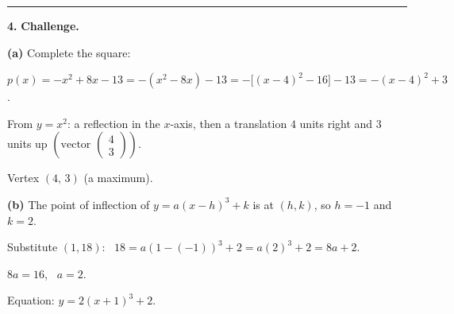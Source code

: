 \documentclass[12pt, twoside]{article}
\begin{document}
\bigskip\hrule\bigskip

\noindent\textbf{4.} \textbf{Challenge.}

\medskip

\textbf{(a)} Complete the square:

$p(x)=-x^2+8x-13=-(x^2-8x)-13=-\big[(x-4)^2-16\big]-13=-(x-4)^2+3$.

From $y=x^2$: a reflection in the $x$-axis, then a translation $4$ units right
and $3$ units up $\left(\text{vector } \left(\begin{smallmatrix}4\\3\end{smallmatrix}\right)\right)$.

Vertex $(4,\,3)$ (a maximum).

\medskip

\textbf{(b)} The point of inflection of $y=a(x-h)^3+k$ is at $(h,k)$, so
$h=-1$ and $k=2$.

Substitute $(1,18)$: \ $18=a(1-(-1))^3+2=a(2)^3+2=8a+2$.

$8a=16$, \ $a=2$.

Equation: $\displaystyle y=2(x+1)^3+2$.
\end{document}
